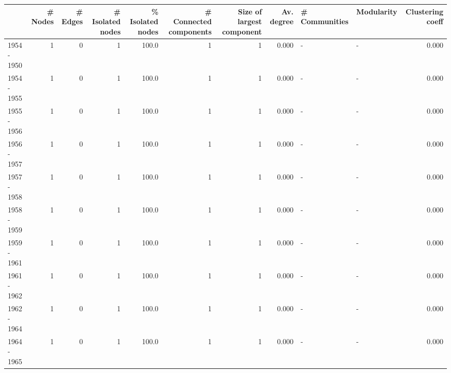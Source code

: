 \begin{tabular}{lrrrrrrrllr}
\toprule
{} &  \# Nodes &  \# Edges &  \# Isolated nodes &  \% Isolated nodes &  \# Connected components &  Size of largest component &  Av. degree & \# Communities & Modularity &  Clustering coeff \\
\midrule
1954 - 1950 &        1 &        0 &                 1 &             100.0 &                       1 &                          1 &       0.000 &             - &          - &             0.000 \\
1954 - 1955 &        1 &        0 &                 1 &             100.0 &                       1 &                          1 &       0.000 &             - &          - &             0.000 \\
1955 - 1956 &        1 &        0 &                 1 &             100.0 &                       1 &                          1 &       0.000 &             - &          - &             0.000 \\
1956 - 1957 &        1 &        0 &                 1 &             100.0 &                       1 &                          1 &       0.000 &             - &          - &             0.000 \\
1957 - 1958 &        1 &        0 &                 1 &             100.0 &                       1 &                          1 &       0.000 &             - &          - &             0.000 \\
1958 - 1959 &        1 &        0 &                 1 &             100.0 &                       1 &                          1 &       0.000 &             - &          - &             0.000 \\
1959 - 1961 &        1 &        0 &                 1 &             100.0 &                       1 &                          1 &       0.000 &             - &          - &             0.000 \\
1961 - 1962 &        1 &        0 &                 1 &             100.0 &                       1 &                          1 &       0.000 &             - &          - &             0.000 \\
1962 - 1964 &        1 &        0 &                 1 &             100.0 &                       1 &                          1 &       0.000 &             - &          - &             0.000 \\
1964 - 1965 &        1 &        0 &                 1 &             100.0 &                       1 &                          1 &       0.000 &             - &          - &             0.000 \\

\end{tabular}
